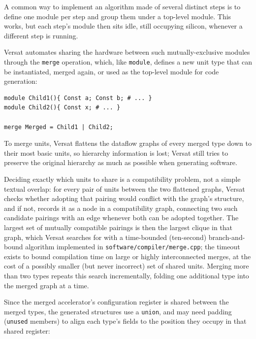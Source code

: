 %

A common way to implement an algorithm made of several distinct steps is
to define one module per step and group them under a top-level module.
This works, but each step's module then sits idle, still occupying silicon,
whenever a different step is running.

Versat automates sharing the hardware between such mutually-exclusive
modules through the \texttt{merge} operation, which, like \texttt{module},
defines a new unit type that can be instantiated, merged again, or used as
the top-level module for code generation:

\begin{lstlisting}[language=VersatSpec,caption={Merging two mutually-exclusive module types into one unit type.},label={lst:merge_example}]
module Child1(){ Const a; Const b; # ... }
module Child2(){ Const x; # ... }

merge Merged = Child1 | Child2;
\end{lstlisting}

To merge units, Versat flattens the dataflow graphs of every merged type
down to their most basic units, so hierarchy information is lost; Versat
still tries to preserve the original hierarchy as much as possible when
generating software.

Deciding exactly which units to share is a compatibility problem, not a simple textual overlap: for every pair of units between the two flattened graphs, Versat checks whether adopting that pairing would conflict with the graph's structure, and if not, records it as a node in a compatibility graph, connecting two such candidate pairings with an edge whenever both can be adopted together. The largest set of mutually compatible pairings is then the largest clique in that graph, which Versat searches for with a time-bounded (ten-second) branch-and-bound algorithm implemented in \texttt{software/compiler/merge.cpp}; the timeout exists to bound compilation time on large or highly interconnected merges, at the cost of a possibly smaller (but never incorrect) set of shared units. Merging more than two types repeats this search incrementally, folding one additional type into the merged graph at a time.

Since the merged accelerator's configuration register
is shared between the merged types, the generated structures use a
\texttt{union}, and may need padding (\texttt{unused} members) to align
each type's fields to the position they occupy in that shared register:

